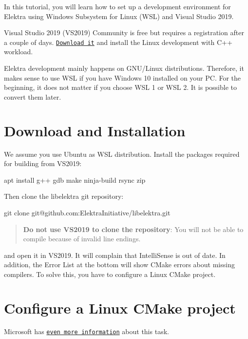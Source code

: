 In this tutorial, you will learn how to set up a development environment for Elektra using Windows Subsystem for Linux (W\+SL) and Visual Studio 2019.

Visual Studio 2019 (V\+S2019) Community is free but requires a registration after a couple of days. \href{https://visualstudio.microsoft.com/downloads/}{\tt Download it} and install the Linux development with C++ workload.

Elektra development mainly happens on G\+N\+U/\+Linux distributions. Therefore, it makes sense to use W\+SL if you have Windows 10 installed on your PC. For the beginning, it does not matter if you choose W\+SL 1 or W\+SL 2. It is possible to convert them later.\hypertarget{doc_tutorials_contributing-windows_md_autotoc_md3795}{}\section{Download and Installation}\label{doc_tutorials_contributing-windows_md_autotoc_md3795}
We assume you use Ubuntu as W\+SL distribution. Install the packages required for building from V\+S2019\+:


\begin{DoxyCode}
apt install g++ gdb make ninja-build rsync zip
\end{DoxyCode}


Then clone the libelektra git repository\+:


\begin{DoxyCode}
git clone git@github.com:ElektraInitiative/libelektra.git
\end{DoxyCode}


\begin{quote}
{\bfseries Do not use V\+S2019 to clone the repository}\+: You will not be able to compile because of invalid line endings. \end{quote}


and open it in V\+S2019. It will complain that Intelli\+Sense is out of date. In addition, the {\ttfamily Error List} at the bottom will show C\+Make errors about missing compilers. To solve this, you have to configure a Linux C\+Make project.\hypertarget{doc_tutorials_contributing-windows_md_autotoc_md3796}{}\section{Configure a Linux C\+Make project}\label{doc_tutorials_contributing-windows_md_autotoc_md3796}
Microsoft has \href{https://docs.microsoft.com/en-us/cpp/linux/cmake-linux-configure?view=msvc-160}{\tt even more information} about this task.

